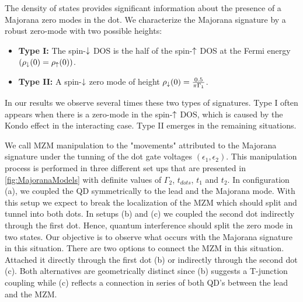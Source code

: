 The density of states provides significant information about the presence of a Majorana zero modes in the dot. We characterize the Majorana signature by a robust zero-mode with two possible heights:
 \begin{itemize}
         \item \textbf{Type I: }  The spin-$\downarrow$ DOS is the half of the spin-$\uparrow$ DOS  at the Fermi energy $(\rho_\downarrow(0)=\rho_\uparrow(0))$. 
         \item \textbf{Type II: } A spin-$\downarrow$ zero mode of height $ \rho_\downarrow(0) = \frac{0.5}{\pi  \Gamma_1}$. 
     \end{itemize}
In our results we observe several times these two types of signatures. Type I often appears when there is a zero-mode in the spin-$\uparrow$ DOS, which is caused by the Kondo effect in the interacting case. Type II emerges in the remaining situations. 

We call MZM manipulation to the "movements" attributed to the Majorana signature under the tunning of the dot gate voltages $( \epsilon_1 , \epsilon_2 )$. This manipulation process is performed in three different set ups that are presented in \ref{fig:MajoranaModels} with definite values of $\Gamma_2$, $t_{dots}$, $t_1$ and $t_2$. In configuration (a), we coupled the QD symmetrically to the lead and the Majorana mode. With this setup we expect to break the localization of the MZM which should split and tunnel into both dots. In setups (b) and (c) we coupled the second dot indirectly through the first dot. Hence, quantum  interference should split the zero mode in two states. Our objective is to observe what occurs with the Majorana signature in this situation. There are two options to connect the MZM in this situation. Attached it directly through the first dot (b) or indirectly through the second dot (c). Both alternatives are geometrically distinct since (b) suggests a T-junction coupling while (c) reflects a connection  in series of both QD's between the lead and the MZM. 


